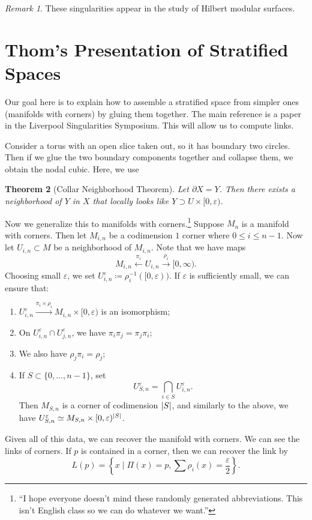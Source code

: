 \documentclass[leqno, openany]{memoir}
\newtheorem{thm}{Theorem}[chapter]
\theoremstyle{definition}
\theoremstyle{remark}
\newtheorem{rmk}[thm]{Remark}
\theoremstyle{plain}
\theoremstyle{definition}
\theoremstyle{remark}
\newcommand{\ep}{\varepsilon}
\begin{document}
\begin{rmk} These singularities appear in the study of Hilbert modular
surfaces.  \end{rmk}

\section{Thom's Presentation of Stratified Spaces}%
\label{sec:thom_s_presentation_of_stratified_spaces}

Our goal here is to explain how to assemble a stratified space from simpler
ones (manifolds with corners) by gluing them together. The main reference is a
paper in the Liverpool Singularities Symposium. This will allow us to compute
links.

Consider a torus with an open slice taken out, so it has boundary two circles.
Then if we glue the two boundary components together and collapse them, we
obtain the nodal cubic. Here, we use

\begin{thm}[Collar Neighborhood Theorem] Let $\partial X = Y$. Then there
exists a neighborhood of $Y$ in $X$ that locally looks like $Y \supset U \times
[0, \ep)$.  \end{thm}

Now we generalize this to manifolds with corners.\footnote{``I hope everyone
doesn't mind these randomly generated abbreviations. This isn't English class
so we can do whatever we want.''} Suppose $M_n$ is a manifold with corners.
Then let $M_{i,n}$ be a codimension $1$ corner where $0 \leq i \leq n-1$. Now
let $U_{i,n} \subset M$ be a neighborhood of $M_{i,n}$. Note that we have maps
\[M_{i,n} \xleftarrow{\pi_i} U_{i,n} \xrightarrow{\rho_i} [0, \infty).\]
Choosing small $\ep$, we set $U_{i,n}^{\ep} \coloneqq \rho_i^{-1}([0, \ep))$.
If $\ep$ is sufficiently small, we can ensure that: \begin{enumerate} \item
    $U_{i,n}^{\ep} \xrightarrow{\pi_i \times \rho_i} M_{i,n} \times [0, \ep)$
    is an isomorphism; \item On $U_{i,n}^{\ep} \cap U_{j,n}^{\ep}$, we have
    $\pi_i \pi_j = \pi_j \pi_i$; \item We also have $\rho_j \pi_i = \rho_j$;
\item If $S \subset \{ 0, \ldots, n-1 \}$, set \[U_{S,n}^{\ep} = \bigcap_{i \in
    S} U_{i,n}^{\ep}.\] Then $M_{S,n}$ is a corner of codimension $\abs{S}$,
    and similarly to the above, we have $U_{S,n}^{\ep} \simeq M_{S,n} \times
    [0, \ep)^{\abs{S}}$.  \end{enumerate} Given all of this data, we can
    recover the manifold with corners. We can see the links of corners. If $p$
    is contained in a corner, then we can recover the link by \[ L(p) = \left\{
    x \mid \Pi(x) = p, \sum \rho_i(x) = \frac{\ep}{2} \right\}. \]
\end{document}
